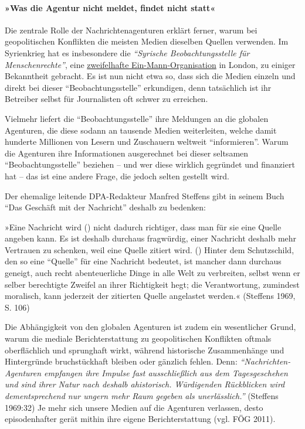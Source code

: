 \hypertarget{was-die-agentur-nicht-meldet-findet-nicht-statt}{%
\paragraph{»Was die Agentur nicht meldet, findet nicht
statt«}\label{was-die-agentur-nicht-meldet-findet-nicht-statt}}

Die zentrale Rolle der Nachrichtenagenturen erklärt ferner, warum bei
geopolitischen Konflikten die meisten Medien dieselben Quellen
verwenden. Im Syrienkrieg hat es insbesondere die \emph{``Syrische
Beobachtungs­stelle für Menschenrechte''}, eine
\href{http://www.sueddeutsche.de/politik/syrische-beobachtungsstelle-fuer-menschenrechte-ominoese-protokollanten-des-todes-1.1522443}{zweifelhafte
Ein-Mann-Organisation} in London, zu einiger Bekanntheit gebracht. Es
ist nun nicht etwa so, dass sich die Medien einzeln und direkt bei
dieser ``Beobachtungs­stelle'' erkundigen, denn tatsächlich ist ihr
Betreiber selbst für Journalisten oft schwer zu erreichen.

Vielmehr liefert die ``Beobachtungsstelle'' ihre Meldungen an die
globalen Agenturen, die diese sodann an tausende Medien weiterleiten,
welche damit hunderte Millionen von Lesern und Zuschauern weltweit
``informieren''. Warum die Agenturen ihre Informationen ausgerechnet bei
dieser seltsamen ``Beobachtungs­stelle'' beziehen -- und wer diese
wirklich gegründet und finanziert hat -- das ist eine andere Frage, die
jedoch selten gestellt wird.

Der ehemalige leitende DPA-Redakteur Manfred Steffens gibt in seinem
Buch ``Das Geschäft mit der Nachricht'' deshalb zu bedenken:

»Eine Nachricht wird () nicht dadurch richtiger, dass man für sie eine
Quelle angeben kann. Es ist deshalb durchaus fragwürdig, einer Nachricht
deshalb mehr Vertrauen zu schenken, weil eine Quelle zitiert wird. ()
Hinter dem Schutzschild, den so eine ``Quelle'' für eine Nachricht
bedeutet, ist mancher dann durchaus geneigt, auch recht abenteuerliche
Dinge in alle Welt zu verbreiten, selbst wenn er selber berechtigte
Zweifel an ihrer Richtigkeit hegt; die Verantwortung, zu­min­dest
moralisch, kann jederzeit der zitierten Quelle angelastet werden.«
(Steffens 1969, S. 106)

Die Abhängigkeit von den globalen Agenturen ist zudem ein wesentlicher
Grund, warum die mediale Bericht­erstattung zu geopolitischen Konflikten
oftmals oberflächlich und sprunghaft wirkt, während historische
Zusammenhänge und Hintergründe bruchstückhaft bleiben oder gänzlich
fehlen. Denn: \emph{``Nachrichten-Agenturen empfangen ihre Impulse fast
ausschließlich aus dem Tagesgeschehen und sind ihrer Natur nach deshalb
ahistorisch. Würdigenden Rückblicken wird dementsprechend nur ungern
mehr Raum} \emph{gegeben} \emph{als unerlässlich.''} (Steffens 1969:32)
Je mehr sich unsere Medien auf die Agenturen verlassen, desto
episodenhafter gerät mithin ihre eigene Bericht­erstattung (vgl. FÖG
2011).

